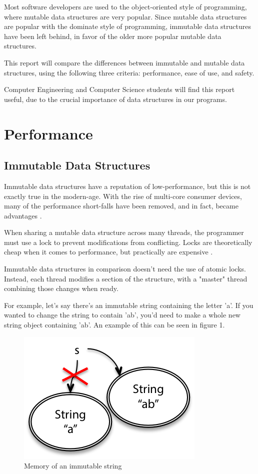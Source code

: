 \documentclass[11pt]{article}
\begin{document}
Most software developers are used to the object-oriented style of programming,
where mutable data structures are very popular. Since mutable data structures
are popular with the dominate style of programming, immutable data structures
have been left behind, in favor of the older more popular mutable data
structures.

This report will compare the differences between immutable and mutable data
structures, using the following three criteria: performance, ease of use, and
safety.

Computer Engineering and Computer Science students will find this report useful,
due to the crucial importance of data structures in our programs.
\clearpage

\section{Performance}
\subsection{Immutable Data Structures}
Immutable data structures have a reputation of low-performance, but this is not
exactly true in the modern-age. With the rise of multi-core consumer devices,
many of the performance short-falls have been removed, and in fact, became
advantages \cite{slaks}.

When sharing a mutable data structure across many threads, the programmer must
use a lock to prevent modifications from conflicting. Locks are theoretically
cheap when it comes to performance, but practically are expensive
\cite{attractive_chaos}.

Immutable data structures in comparison doesn't need the use of atomic locks.
Instead, each thread modifies a section of the structure, with a "master"
thread combining those changes when ready.

For example, let's say there's an immutable string containing the letter 'a'.
If you wanted to change the string to contain 'ab', you'd need to make a whole
new string object containing 'ab'. An example of this can be seen in figure 1.

\begin{figure}[H]
\centering

\includegraphics{immutable_string}
\caption{Memory of an immutable string \cite{mit_reading_9}}

\end{figure}
\end{document}
